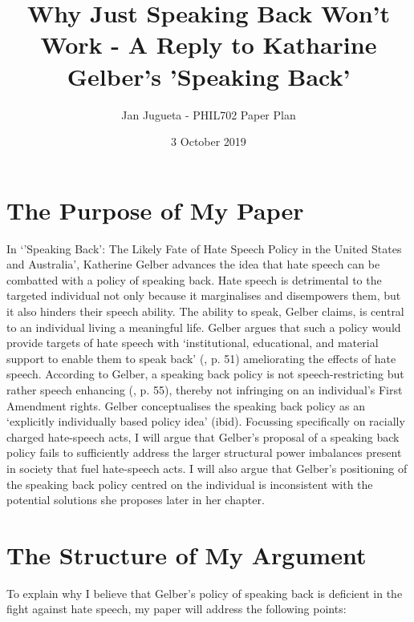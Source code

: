 \documentclass{article}
\title{Why Just Speaking Back Won't Work - A Reply to Katharine Gelber's 'Speaking Back'}
\author{Jan Jugueta - PHIL702 Paper Plan}
\date{3 October 2019}
\begin{document}
\maketitle

\section{The Purpose of My Paper}

In ‘’Speaking Back’: The Likely Fate of Hate Speech Policy in the United States and Australia’, Katherine Gelber advances the idea that hate speech can be combatted with a policy of speaking back. Hate speech is detrimental to the targeted individual not only because it marginalises and disempowers them, but it also hinders their speech ability. The ability to speak, Gelber claims, is central to an individual living a meaningful life. Gelber argues that such a policy would provide targets of hate speech with ‘institutional, educational, and material support to enable them to speak back’ (\cite{gelber}, p. 51)  ameliorating the effects of hate speech. According to Gelber, a speaking back policy is not speech-restricting but rather speech enhancing (\cite{gelber}, p. 55), thereby not infringing on an individual’s First Amendment rights. Gelber conceptualises the speaking back policy as an ‘explicitly individually based policy idea’ (ibid). Focussing specifically on racially charged hate-speech acts, I will argue that Gelber’s proposal of a speaking back policy fails to sufficiently address the larger structural power imbalances present in society that fuel hate-speech acts. I will also argue that Gelber’s positioning of the speaking back policy centred on the individual is inconsistent with the potential solutions she proposes later in her chapter.

\section{The Structure of My Argument}

To explain why I believe that Gelber’s policy of speaking back is deficient in the fight against hate speech, my paper will address the following points:
\end{document}

